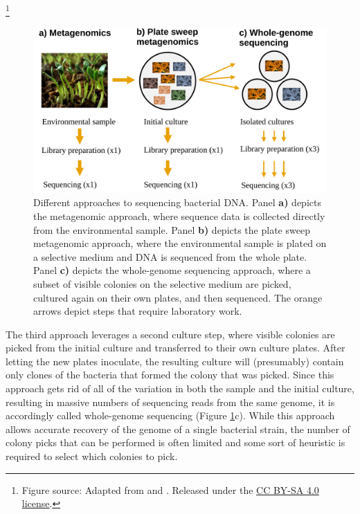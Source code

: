\documentclass[officiallayout]{tktla}
\let\svthefootnote\thefootnote
\begin{document}
\noindent\let\thefootnote\relax\footnote{Figure source: Adapted from \cite{praveera_fenugreek-sprouts} and \cite{niaid_escherichia-coli}. Released under the \href{https://creativecommons.org/licenses/by-sa/4.0}{CC BY-SA 4.0 license}.}
\addtocounter{footnote}{-1}\let\thefootnote\svthefootnote
\begin{figure}[!ht]
  \label{fig:microbiome-sampling-methods}
    \centering
    \includegraphics[width=\textwidth,keepaspectratio]{img/sampling/microbiome_sampling_methods.pdf}
    \caption{Different approaches to sequencing bacterial DNA. Panel \textbf{a)} depicts the metagenomic approach, where sequence data is collected directly from the environmental sample. Panel \textbf{b)} depicts the plate sweep metagenomic approach, where the environmental sample is plated on a selective medium and DNA is sequenced from the whole plate. Panel \textbf{c)} depicts the whole-genome sequencing approach, where a subset of visible colonies on the selective medium are picked, cultured again on their own plates, and then sequenced. The orange arrows depict steps that require laboratory work.}
\end{figure}

The third approach leverages a second culture step, where visible
colonies are picked from the initial culture and transferred to their
own culture plates. After letting the new plates inoculate, the
resulting culture will (presumably) contain only clones of the
bacteria that formed the colony that was picked. Since this approach
gets rid of all of the variation in both the sample and the initial
culture, resulting in massive numbers of sequencing reads from the
same genome, it is accordingly called whole-genome sequencing (Figure
\ref{fig:microbiome-sampling-methods}c). While this approach allows
accurate recovery of the genome of a single bacterial strain, the
number of colony picks that can be performed is often limited and some
sort of heuristic is required to select which colonies to pick.
\end{document}
